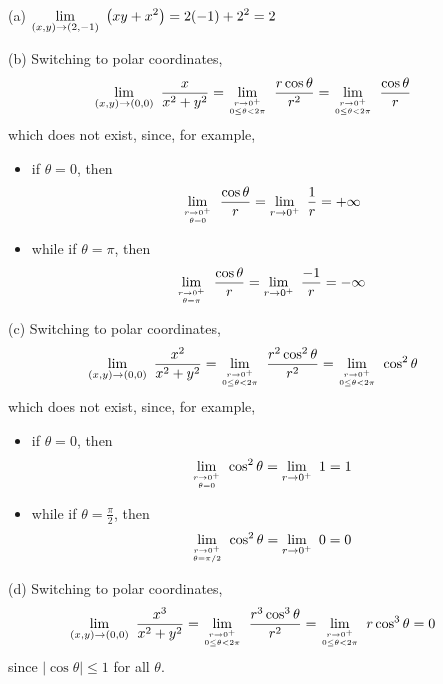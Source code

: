 \begin{solution}
(a) $\dst\lim_{(x,y)\rightarrow(2,-1)}\ \big(xy+x^2\big)=2(-1)+2^2=2$

(b) Switching to polar coordinates,
\begin{align*}
\lim_{(x,y)\rightarrow(0,0)}\ \frac{x}{x^2+y^2}
    &=\lim_{\Atop{r\rightarrow0^+}{0\le\theta<2\pi}}\ \frac{r\cos\theta}{r^2}
     =\lim_{\Atop{r\rightarrow0^+}{0\le\theta<2\pi}}\ \frac{\cos\theta}{r} 
\end{align*}
which does not exist, since, for example,
\begin{itemize}
\item 
if $\theta=0$, then 
\begin{equation*}
\lim_{\Atop{r\rightarrow0^+}{\theta=0}}\ \frac{\cos\theta}{r}
=\lim_{r\rightarrow0^+}\ \frac{1}{r}
=+\infty
\end{equation*}
\item
while if $\theta=\pi$, then 
\begin{equation*}
\lim_{\Atop{r\rightarrow0^+}{\theta=\pi}}\ \frac{\cos\theta}{r}
=\lim_{r\rightarrow0^+}\ \frac{-1}{r}
=-\infty
\end{equation*}
\end{itemize}

(c) Switching to polar coordinates,
\begin{align*}
\lim_{(x,y)\rightarrow(0,0)}\ \frac{x^2}{x^2+y^2}
  &=\lim_{\Atop{r\rightarrow0^+}{0\le\theta<2\pi}}\ \frac{r^2\cos^2\theta}{r^2}
     =\lim_{\Atop{r\rightarrow0^+}{0\le\theta<2\pi}}\ \cos^2\theta 
\end{align*}
which does not exist, since, for example,
\begin{itemize}
\item 
if $\theta=0$, then 
\begin{equation*}
\lim_{\Atop{r\rightarrow0^+}{\theta=0}}\ \cos^2\theta
=\lim_{r\rightarrow0^+}\ 1
= 1
\end{equation*}
\item
while if $\theta=\frac{\pi}{2}$, then 
\begin{equation*}
\lim_{\Atop{r\rightarrow0^+}{\theta=\pi/2}}\ \cos^2\theta
=\lim_{r\rightarrow0^+}\ 0
=0
\end{equation*}
\end{itemize}

(d) Switching to polar coordinates,
\begin{align*}
\lim_{(x,y)\rightarrow(0,0)}\ \frac{x^3}{x^2+y^2}
   &=\lim_{\Atop{r\rightarrow0^+}{0\le\theta<2\pi}}\ \frac{r^3\cos^3\theta}{r^2}
     =\lim_{\Atop{r\rightarrow0^+}{0\le\theta<2\pi}}\ r\cos^3\theta 
    =0
\end{align*}
since $|\cos\theta|\le 1$ for all $\theta$.


\end{solution}
